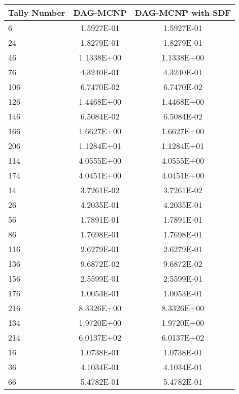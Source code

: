 \begin{table}
  \small
  \begin{center}
    \begin{tabular}{lcc}
      \toprule
      Tally Number & DAG-MCNP   & DAG-MCNP with SDF \\
      \toprule
      6            & 1.5927E-01 & 1.5927E-01        \\
      24           & 1.8279E-01 & 1.8279E-01        \\
      46           & 1.1338E+00 & 1.1338E+00        \\
      76           & 4.3240E-01 & 4.3240E-01        \\
      106          & 6.7470E-02 & 6.7470E-02        \\
      126          & 1.4468E+00 & 1.4468E+00        \\
      146          & 6.5084E-02 & 6.5084E-02        \\
      166          & 1.6627E+00 & 1.6627E+00        \\
      206          & 1.1284E+01 & 1.1284E+01        \\
      114          & 4.0555E+00 & 4.0555E+00        \\
      174          & 4.0451E+00 & 4.0451E+00        \\
      14           & 3.7261E-02 & 3.7261E-02        \\
      26           & 4.2035E-01 & 4.2035E-01        \\
      56           & 1.7891E-01 & 1.7891E-01        \\
      86           & 1.7698E-01 & 1.7698E-01        \\
      116          & 2.6279E-01 & 2.6279E-01        \\
      136          & 9.6872E-02 & 9.6872E-02        \\
      156          & 2.5599E-01 & 2.5599E-01        \\
      176          & 1.0053E-01 & 1.0053E-01        \\
      216          & 8.3326E+00 & 8.3326E+00        \\
      134          & 1.9720E+00 & 1.9720E+00        \\
      214          & 6.0137E+02 & 6.0137E+02        \\
      16           & 1.0738E-01 & 1.0738E-01        \\
      36           & 4.1034E-01 & 4.1034E-01        \\
      66           & 5.4782E-01 & 5.4782E-01        \\

\end{tabular}
\end{center}
\end{table}
